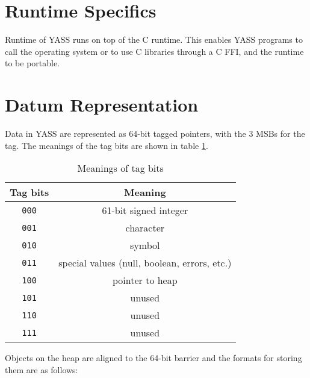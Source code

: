 \documentclass{article}
\begin{document}
\section{Runtime Specifics}

Runtime of YASS runs on top of the C runtime. This enables YASS programs
to call the operating system or to use C libraries through a C FFI, and
the runtime to be portable.

\section{Datum Representation}

Data in YASS are represented as 64-bit
tagged pointers, with the 3 MSBs for the tag. The meanings of the tag bits
are shown in table \ref{tab:tags}.

\begin{table}
  \centering
  \begin{tabular}{cc}
    \toprule
    Tag bits & Meaning \\
    \midrule
    \verb|000| & 61-bit signed integer \\
    \verb|001| & character \\
    \verb|010| & symbol \\
    \verb|011| & special values (null, boolean, errors, etc.) \\
    \verb|100| & pointer to heap \\
    \verb|101| & unused \\
    \verb|110| & unused \\
    \verb|111| & unused \\
    \bottomrule
  \end{tabular}
  \caption{Meanings of tag bits}
  \label{tab:tags}
\end{table}

Objects on the heap are aligned to the 64-bit barrier and the formats
for storing them are as follows:
\end{document}
